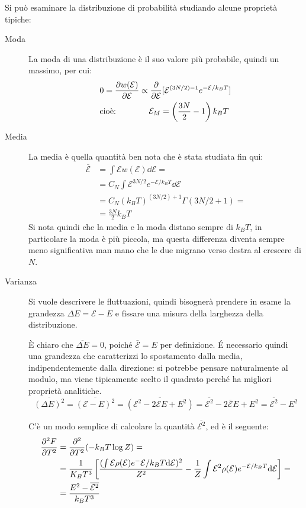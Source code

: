 Si può esaminare la distribuzione di probabilità studiando alcune proprietà tipiche:
\begin{description}
	\item[Moda] La moda di una distribuzione è il suo valore più probabile, quindi un massimo, per cui:
	\begin{align*}
	&0 = \frac{\partial {w(\mathcal{E})}}{\partial {\mathcal{E}}} \propto \frac{\partial {}}{\partial {\mathcal{E}}}[\mathcal{E}^{(3N/2)-1}e^{-\mathcal{E}/k_B T}]\\
	&\text{cioè:} \qquad \qquad \mathcal{E}_M = \left(\frac{3N}{2} - 1\right) k_B T
	\end{align*}
	
	\item[Media] La media è quella quantità ben nota che è stata studiata fin qui:
	\begin{align*}
	\bar{\mathcal{E}} &= \int \mathcal{E} w(\mathcal{E}) \dd \mathcal{E} =\\
	&= C_N \int \mathcal{E}^{3N/2}e^{-\mathcal{E}/k_B T} \dd \mathcal{E}\\
	&= C_N (k_B T)^{(3N/2) + 1} \Gamma(3N/2 +1) =\\
	&= \frac{3N}{2} k_B T
	\end{align*}
	Si nota quindi che la media e la moda distano sempre di $k_B T$, in particolare la moda è più piccola, ma questa differenza diventa sempre meno significativa man mano che le due migrano verso destra al crescere di $N$.
	
	\item[Varianza] Si vuole descrivere le fluttuazioni, quindi bisognerà prendere in esame la grandezza $\Delta E = \mathcal{E} - E$ e fissare una misura della larghezza della distribuzione.
	
	\`E chiaro che $\overline{\Delta E} = 0$, poiché $\bar{\mathcal{E}} = E$ per definizione. \'E necessario quindi una grandezza che caratterizzi lo spostamento dalla media, indipendentemente dalla direzione: si potrebbe pensare naturalmente al modulo, ma viene tipicamente scelto il quadrato perché ha migliori proprietà analitiche.
	\begin{equation*}
	\overline{(\Delta E)^2} = \overline{(\mathcal{E} - E)^2} = \overline{(\mathcal{E}^2 - 2\mathcal{E}E + E^2)} = \overline{\mathcal{E}^2} - 2\bar{\mathcal{E}}E + E^2 = \overline{\mathcal{E}^2} - E^2
	\end{equation*}
	
	C'è un modo semplice di calcolare la quantità $\overline{\mathcal{E}^2}$, ed è il seguente:
	\begin{align*}
	\frac{\partial {^2 F}}{\partial {T^2}} &= \frac{\partial {^2}}{\partial {T^2}} (-k_B T \log Z) =\\
	&= \frac{1}{K_B T^3}\left[\frac{(\int\mathcal{E} \rho(\mathcal{E})e^-{\mathcal{E}/k_B T} \dd \mathcal{E})^2}{Z^2}-\frac{1}{Z} \int \mathcal{E}^2\rho(\mathcal{E})e^{-\mathcal{E}/k_B T}\dd \mathcal{E}\right] =\\
	&= \frac{E^2 - \overline{\mathcal{E}^2}}{k_B T^3}
	\end{align*}
	

\end{description}
